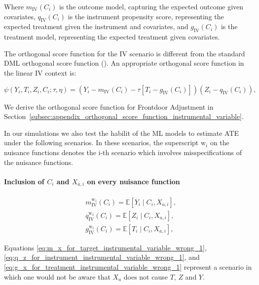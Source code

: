 \documentclass{article}
\numberwithin{equation}{section}
\begin{document}
Where $m_{\text{IV}}(C_i)$ is the outcome model, capturing the expected outcome given covariates, $q_{\text{IV}}(C_i)$ is the instrument propensity score, representing the expected treatment given the instrument and covariates, and $g_{\text{IV}}(C_i)$ is the treatment model, representing the expected treatment given covariates.

The orthogonal score function for the IV scenario is different from the standard DML orthogonal score function (\cite{BelloniChernozhukovHansen2014, ChernozhukovChetverikovDemireretal2018}). An appropriate orthogonal score function in the linear IV context is:

\begin{equation}
    \psi(Y_i, T_i, Z_i, C_i; \tau, \eta) = \left( Y_i - m_{\text{IV}}(C_i) - \tau [T_i - g_{\text{IV}}(C_i)] \right) \left( Z_i - q_{\text{IV}}(C_i) \right),
    \label{eq:orthogonal_score_iv}
\end{equation}

We derive the orthogonal score function for Frontdoor Adjustment in Section~\ref{subsec:appendix_orthogonal_score_function_instrumental_variable}.

In our simulations we also test the habilit of the ML models to estimate ATE under the following scenarios. In these scenarios, the superscript $\text{w}_i$ on the nuisance functions denotes the i-th scenario which involves misspecifications of the nuisance functions.

\paragraph{Inclusion of $C_i$ and $X_{a, i}$ on every nuisance function}

\begin{align}
    & m_{\text{IV}}^{\text{w}_1}(C_i) = \mathbb{E}[Y_i \mid C_i, X_{a, i}],
    \label{eq:m_x_for_target_instrumental_variable_wrong_1} \\
    & q_{\text{IV}}^{\text{w}_1}(C_i) = \mathbb{E}[Z_i \mid C_i, X_{a, i}],
    \label{eq:q_z_for_instrument_instrumental_variable_wrong_1} \\
    & g_{\text{IV}}^{\text{w}_1}(C_i) = \mathbb{E}[T_i \mid C_i, X_{a, i}],
    \label{eq:g_x_for_treatment_instrumental_variable_wrong_1}
\end{align}

Equations \eqref{eq:m_x_for_target_instrumental_variable_wrong_1}, \eqref{eq:q_z_for_instrument_instrumental_variable_wrong_1}, and \eqref{eq:g_x_for_treatment_instrumental_variable_wrong_1} represent a scenario in which one would not be aware that $X_a$ does not cause $T$, $Z$ and $Y$.
\end{document}
